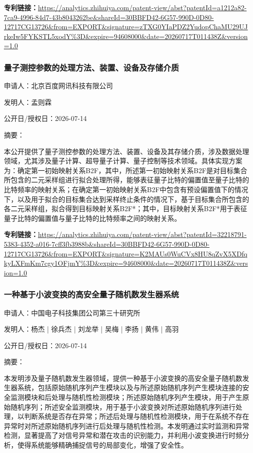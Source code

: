\documentclass[12pt,a4paper]{ctexart}
\begin{document}
\noindent\textbf{专利链接：}\url{https://analytics.zhihuiya.com/patent-view/abst?patentId=a1212a82-7ca9-4996-84d7-43b8043262be&shareId=30BBFD42-6G57-990D-0D80-12717CG13726&from=EXPORT&signature=zTXG0YIaPDZ2YudopChaMU29UJrkeIw5FYKSTL5xodY%3D&expire=94608000&date=20260717T011438Z&version=1.0}

\subsubsection{ 量子测控参数的处理方法、装置、设备及存储介质 }

申请人：北京百度网讯科技有限公司

发明人：孟则霖

公开日/授权日：2026-07-14

摘要：

本公开提供了量子测控参数的处理方法、装置、设备及其存储介质，涉及数据处理领域，尤其涉及量子计算、超导量子计算、量子控制等技术领域。具体实现方案为：确定第一初始映射关系B2F，其中，所述第一初始映射关系B2F是对目标集合所包含的二元采样组进行拟合处理所得，能够表征量子比特的偏置值至量子比特的比特频率的映射关系；在确定第一初始映射关系B2F中包含有预设偏置值下的情况下，以及用于拟合的目标集合达到采样终止条件的情况下，基于目标集合所包含的各二元采样组，拟合得到目标映射关系B2F*；其中，目标映射关系B2F*用于表征量子比特的偏置值与量子比特的比特频率之间的映射关系。

\noindent\textbf{专利链接：}\url{https://analytics.zhihuiya.com/patent-view/abst?patentId=32218791-5383-4352-a016-7cff3fb3988b&shareId=30BBFD42-6G57-990D-0D80-12717CG13726&from=EXPORT&signature=K2MAUs0WuCVx8HU8qZvX5XDfqkyLXFmKm7cgy1OFjmY%3D&expire=94608000&date=20260717T011438Z&version=1.0}

\subsubsection{ 一种基于小波变换的高安全量子随机数发生器系统 }

申请人：中国电子科技集团公司第三十研究所

发明人：杨杰 | 徐兵杰 | 刘龙举 | 吴梅 | 李扬 | 黄伟 | 高羽

公开日/授权日：2026-07-14

摘要：

本发明涉及量子随机数发生器领域，提供一种基于小波变换的高安全量子随机数发生器系统，包括原始随机序列产生模块以及与所述原始随机序列产生模块连接的安全监测模块和后处理与随机性检测模块；所述原始随机序列产生模块，用于产生原始随机序列；所述安全监测模块，用于基于小波变换对所述原始随机序列进行处理，以判断系统是否存在异常；所述后处理与随机性检测模块，用于在系统不存在异常时对所述原始随机序列进行后处理与随机性检测。本发明通过实时监测和异常检测，显著提高了对信号异常和潜在攻击的识别能力，并利用小波变换进行时频分析，使得系统能够精确捕捉信号的局部变化，增强了安全性。
\end{document}
